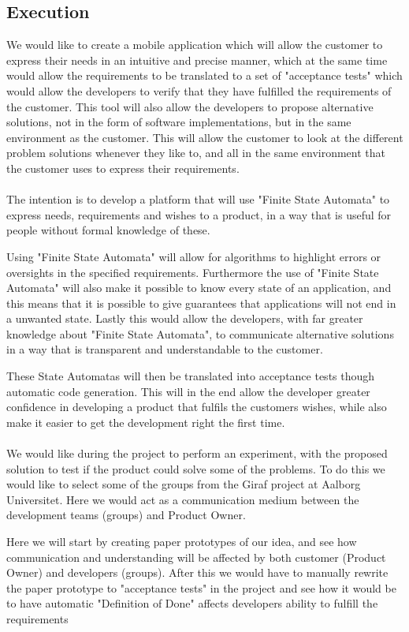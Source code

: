 \subsection{Execution}
We would like to create a mobile application which will allow the customer to express their needs in an intuitive and precise manner, which at the same time would allow the requirements to be translated to a set of "acceptance tests" which would allow the developers to verify that they have fulfilled the requirements of the customer.
This tool will also allow the developers to propose alternative solutions, not in the form of software implementations, but in the same environment as the customer. 
This will allow the customer to look at the different problem solutions whenever they like to, and all in the same environment that the customer uses to express their requirements. 
\\\\
The intention is to develop a platform that will use "Finite State Automata" to express needs, requirements and wishes to a product, in a way that is useful for people without formal knowledge of these. 

Using "Finite State Automata" will allow for algorithms to highlight errors or oversights in the specified requirements.
Furthermore the use of "Finite State Automata" will also make it possible to know every state of an application, and this means that it is possible to give guarantees that applications will not end in a unwanted state. 
Lastly this would allow the developers, with far greater knowledge about "Finite State Automata", to communicate alternative solutions in a way that is transparent and understandable to the customer. 

These State Automatas will then be translated into acceptance tests though automatic code generation.
This will in the end allow the developer greater confidence in developing a product that fulfils the customers wishes, while also make it easier to get the development right the first time.
\\\\
We would like during the project to perform an experiment, with the proposed solution to test if the product could solve some of the problems.
To do this we would like to select some of the groups from the Giraf project at Aalborg Universitet. 
Here we would act as a communication medium between the development teams (groups) and Product Owner.

Here we will start by creating paper prototypes of our idea, and see how communication and understanding will be affected by both customer (Product Owner) and developers (groups).
After this we would have to manually rewrite the paper prototype to "acceptance tests" in the project and see how it would be to have automatic "Definition of Done" affects developers ability to fulfill the requirements

